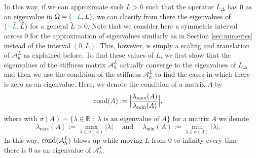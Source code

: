 \documentclass[10 pt]{article}
\numberwithin{equation}{section}
\def\tilde{\widetilde}
\def\R{\mathbb{R}}
\newcommand{\SJ}[1]{{\color{ForestGreen} #1}}  %
\begin{document}
In this way, if we can approximate such $L>0$ such that the operator $L_{\Delta}$ has $0$ as an eigenvalue in $\Omega=(\SJ{-L},L)$, we can classify from there the eigenvalues of $(\SJ{-\tilde{L}},\tilde{L})$ for a general $\tilde{L}>0$. \SJ{Note that we consider here a symmetric interval across $0$ for the approximation of eigenvalues similarly as in Section \ref{sec:numerics} instead of the interval $(0,L)$. This, however, is simply a scaling and translation of $\mathcal{A}^L_h$ as explained before.} To find these values of $L$, we first show that the eigenvalues of the stiffness matrix $\mathcal A_h^L$ actually converge to the eigenvalues of $L_{\Delta}$ and then we use the condition of the stiffness $\mathcal{A}^L_h$ to find the cases in which there is zero as an eigenvalue. Here, we denote the condition of a matrix $A$ by
\begin{equation}\label{defi:condition}
\textnormal{cond}(A):=\Big|\frac{\lambda_{\max}(A)}{\lambda_{\min}(A)}\Big|,
\end{equation}
where with $\sigma(A)=\{\lambda\in \R\;:\; \lambda\text{ is an eigenvalue of $A$}\}$ for a matrix $A$ we denote
$$
\lambda_{\max}(A):=\max_{\lambda\in \sigma(A)}|\lambda|\quad\text{ and }\quad \lambda_{\min}(A):=\min_{\lambda\in \sigma(A)}|\lambda|.
$$
In this way, $\textnormal{cond}(\mathcal{A}^L_h)$ blows up while moving $L$ from $0$ to infinity every time there is $0$ as an eigenvalue of $\mathcal{A}^L_h$.\\
\end{document}
